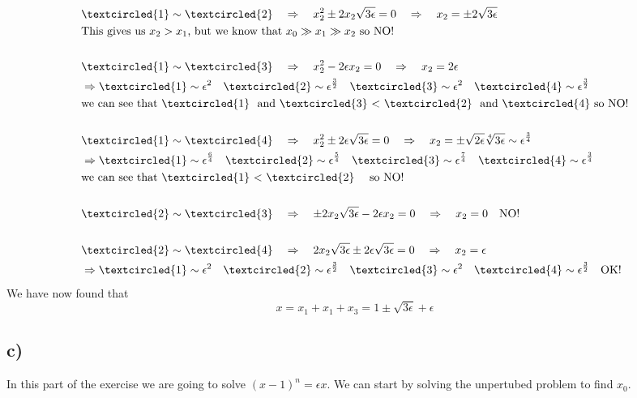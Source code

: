 \documentclass[english,a4paper,12pt]{article}
\begin{document}
\begin{align*}
&\textcircled{1} \sim \textcircled{2} \quad \Rightarrow \quad x_2^2 \pm 2x_2\sqrt{3 \epsilon}=0 \quad \Rightarrow \quad x_2 = \pm 2\sqrt{3\epsilon}\\
&\text{This gives us $x_2 > x_1$, but we know that $x_0 \gg x_1 \gg x_2 $ so NO!}\\\\
&\textcircled{1} \sim \textcircled{3} \quad \Rightarrow \quad x_2^2 - 2 \epsilon x_2 =0 \quad \Rightarrow \quad x_2 = 2\epsilon\\
&\Rightarrow \textcircled{1} \sim \epsilon^2 \quad \textcircled{2} \sim \epsilon^{\frac{3}{2}}  \quad  \textcircled{3} \sim \epsilon^2 \quad  \textcircled{4} \sim \epsilon^{\frac{3}{2}}\\
&\text{we can see that \textcircled{1} \text{ and} \textcircled{3} $<$ \textcircled{2} \text{ and} \textcircled{4} so NO!}\\\\
&\textcircled{1} \sim \textcircled{4} \quad \Rightarrow \quad x_2^2 \pm 2\epsilon\sqrt{3\epsilon}=0 \quad \Rightarrow \quad x_2 = \pm\sqrt{2\epsilon}\sqrt[4]{3\epsilon} \sim \epsilon^{\frac{3}{4}}\\
&\Rightarrow \textcircled{1} \sim \epsilon^{\frac{6}{4}} \quad \textcircled{2} \sim \epsilon^{\frac{5}{4}}  \quad  \textcircled{3} \sim \epsilon^{\frac{7}{4}} \quad  \textcircled{4} \sim \epsilon^{\frac{3}{4}}\\
&\text{we can see that \textcircled{1} $<$ \textcircled{2} \quad so NO!}\\\\
&\textcircled{2} \sim \textcircled{3} \quad \Rightarrow \quad \pm 2 x_2 \sqrt{3 \epsilon} - 2 \epsilon x_2 = 0 \quad \Rightarrow \quad x_2 = 0 \quad \text{NO!}\\\\
&\textcircled{2} \sim \textcircled{4} \quad \Rightarrow \quad 2 x_2 \sqrt{3 \epsilon} \pm 2 \epsilon \sqrt{3 \epsilon}= 0 \quad \Rightarrow \quad x_2 = \epsilon\\
&\Rightarrow \textcircled{1} \sim \epsilon^2 \quad \textcircled{2} \sim \epsilon^{\frac{3}{2}}  \quad  \textcircled{3} \sim \epsilon^2 \quad  \textcircled{4} \sim \epsilon^{\frac{3}{2}} \quad \text{OK!}\\
\end{align*}
We have now found that $$x = x_1 + x_1 + x_3 = 1 \pm \sqrt{3 \epsilon} + \epsilon $$
\subsection*{c)}
In this part of the exercise we are going to solve $(x-1)^n=\epsilon x$. We can start by solving the unpertubed problem to find $x_0$.\\
\end{document}
